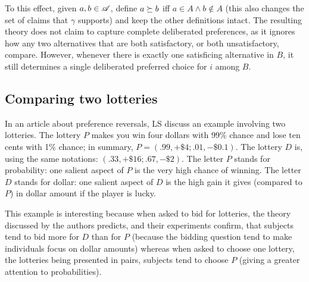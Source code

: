 \documentclass[version=last, pagesize, twoside=off, bibliography=totoc, DIV=calc, fontsize=12pt, a4paper, french, english]{scrartcl}
\begin{document}
To this effect, given $a, b \in \mathscr{A}$, define $a \succeq b$ iff $a \in A \land b \notin A$ (this also changes the set of claims that $\gamma$ supports) and keep the other definitions intact.
The resulting theory does not claim to capture complete deliberated preferences, as it ignores how any two alternatives that are both satisfactory, or both unsatisfactory, compare. However, whenever there is exactly one satisficing alternative in $B$, it still determines a single deliberated preferred choice for $i$ among $B$.

\subsection{Comparing two lotteries}
%
%
%
%
%
%
In an article about preference reversals, LS discuss an example involving two lotteries. The lottery $P$ makes you win four dollars with 99\% chance and lose ten cents with 1\% chance; in summary, $P = (.99, +\$4; .01, −\$0.1)$. The lottery $D$ is, using the same notations: $(.33, +\$16; .67, −\$2)$. The letter $P$ stands for probability: one salient aspect of $P$ is the very high chance of winning. The letter $D$ stands for dollar: one salient aspect of $D$ is the high gain it gives (compared to $P$) in dollar amount if the player is lucky.

This example is interesting because when asked to bid for lotteries, the theory discussed by the authors predicts, and their experiments confirm, that subjects tend to bid more for $D$ than for $P$ (because the bidding question tend to make individuals focus on dollar amounts) whereas when asked to choose one lottery, the lotteries being presented in pairs, subjects tend to choose $P$ (giving a greater attention to probabilities).
\end{document}
